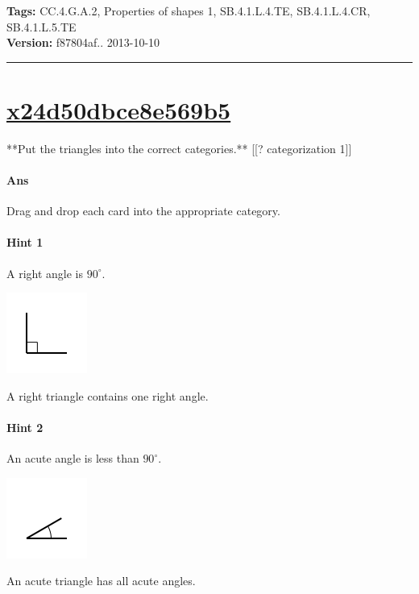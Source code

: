 \documentclass[twocolumn,10pt]{article}
\def\shrinkfactor{0.55}
\begin{document}
\medskip
\noindent
\textbf{Tags:} {\footnotesize CC.4.G.A.2, Properties of shapes 1, SB.4.1.L.4.TE, SB.4.1.L.4.CR, SB.4.1.L.5.TE}\\
\textbf{Version:} f87804af.. 2013-10-10
\smallskip\hrule





\section{\href{https://www.khanacademy.org/devadmin/content/items/x24d50dbce8e569b5}{x24d50dbce8e569b5}}

\noindent
**Put the triangles into the correct categories.**
[[? categorization 1]]


\paragraph{Ans} Drag and drop each card into the appropriate category. 

\paragraph{Hint 1}A right angle is $90 ^\circ$.

\includegraphics[scale=\shrinkfactor]{figures/e6ad77b54552295693aae7e39624ed456b552099.png}

A right triangle contains one right angle.

\paragraph{Hint 2}An acute angle is less than $90 ^\circ$.

\includegraphics[scale=\shrinkfactor]{figures/d3a2a4fb2274b18d8b340c80127ae99c1ed8b1f9.png}

An acute triangle has all acute angles.
\end{document}
